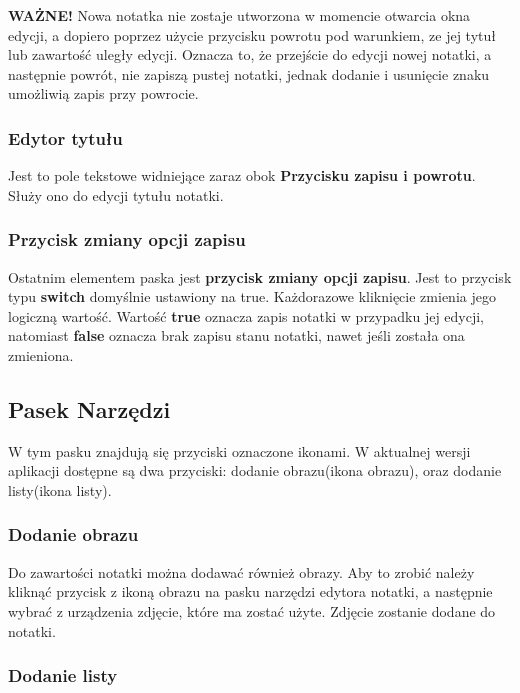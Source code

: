 \documentclass[shortabstract]{iithesis}
\begin{document}
\textbf{WAŻNE!} Nowa notatka nie zostaje utworzona w momencie otwarcia okna edycji, a dopiero poprzez użycie przycisku powrotu pod warunkiem, ze jej tytuł lub zawartość uległy edycji. Oznacza to, że przejście do edycji nowej notatki, a następnie powrót, nie zapiszą pustej notatki, jednak dodanie i usunięcie znaku umożliwią zapis przy powrocie.

\subsubsection{Edytor tytułu}

Jest to pole tekstowe widniejące zaraz obok \textbf{Przycisku zapisu i powrotu}. Służy ono do edycji tytułu notatki.

\subsubsection{Przycisk zmiany opcji zapisu}

Ostatnim elementem paska jest \textbf{przycisk zmiany opcji zapisu}. Jest to przycisk typu \textbf{switch} domyślnie ustawiony na true. Każdorazowe kliknięcie zmienia jego logiczną wartość.
Wartość \textbf{true} oznacza zapis notatki w przypadku jej edycji, natomiast \textbf{false} oznacza brak zapisu stanu notatki, nawet jeśli została ona zmieniona.

\subsection{Pasek Narzędzi}

W tym pasku znajdują się przyciski oznaczone ikonami.
W aktualnej wersji aplikacji dostępne są dwa przyciski: dodanie obrazu(ikona obrazu), oraz dodanie listy(ikona listy).

\subsubsection{Dodanie obrazu}

Do zawartości notatki można dodawać również obrazy. Aby to zrobić należy kliknąć przycisk z ikoną obrazu na pasku narzędzi edytora notatki, a następnie wybrać z urządzenia zdjęcie, które ma zostać użyte. Zdjęcie zostanie dodane do notatki.

\subsubsection{Dodanie listy}
\end{document}
